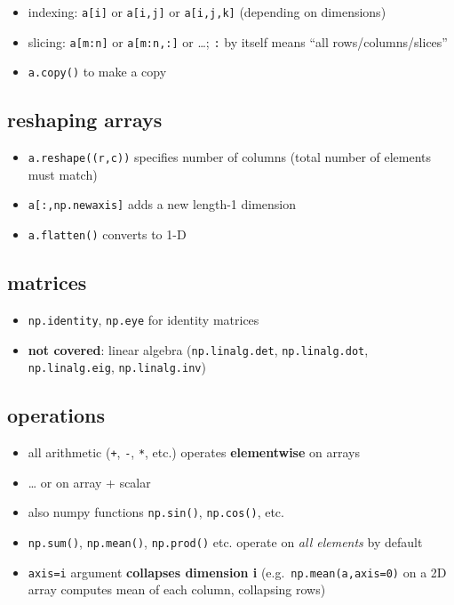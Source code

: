 \documentclass[]{tufte-handout}
\providecommand{\tightlist}{%
  \setlength{\itemsep}{0pt}\setlength{\parskip}{0pt}}
\begin{document}
\begin{itemize}
\tightlist
\item
  indexing: \texttt{a{[}i{]}} or \texttt{a{[}i,j{]}} or
  \texttt{a{[}i,j,k{]}} (depending on dimensions)
\item
  slicing: \texttt{a{[}m:n{]}} or \texttt{a{[}m:n,:{]}} or \ldots;
  \texttt{:} by itself means ``all rows/columns/slices''
\item
  \texttt{a.copy()} to make a copy
\end{itemize}

\hypertarget{reshaping-arrays}{%
\subsection{reshaping arrays}\label{reshaping-arrays}}

\begin{itemize}
\tightlist
\item
  \texttt{a.reshape((r,c))} specifies number of columns (total number of
  elements must match)
\item
  \texttt{a{[}:,np.newaxis{]}} adds a new length-1 dimension
\item
  \texttt{a.flatten()} converts to 1-D
\end{itemize}

\hypertarget{matrices}{%
\subsection{matrices}\label{matrices}}

\begin{itemize}
\tightlist
\item
  \texttt{np.identity}, \texttt{np.eye} for identity matrices
\item
  \textbf{not covered}: linear algebra (\texttt{np.linalg.det},
  \texttt{np.linalg.dot}, \texttt{np.linalg.eig},
  \texttt{np.linalg.inv})
\end{itemize}

\hypertarget{operations}{%
\subsection{operations}\label{operations}}

\begin{itemize}
\tightlist
\item
  all arithmetic (\texttt{+}, \texttt{-}, \texttt{*}, etc.) operates
  \textbf{elementwise} on arrays
\item
  \ldots{} or on array + scalar
\item
  also numpy functions \texttt{np.sin()}, \texttt{np.cos()}, etc.
\item
  \texttt{np.sum()}, \texttt{np.mean()}, \texttt{np.prod()} etc. operate
  on \emph{all elements} by default
\item
  \texttt{axis=i} argument \textbf{collapses dimension i}
  (e.g.~\texttt{np.mean(a,axis=0)} on a 2D array computes mean of each
  column, collapsing rows)
\end{itemize}
\end{document}
